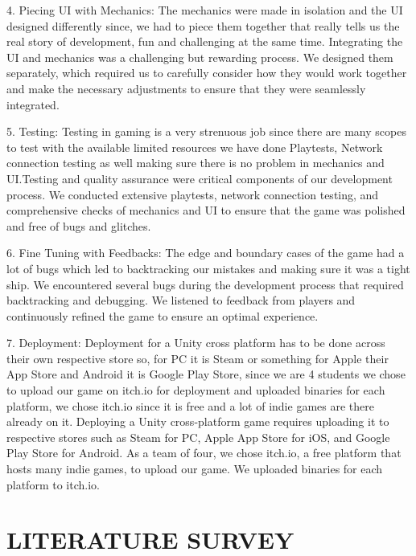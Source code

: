 \documentclass[12pt]{report}
\begin{document}
4.	Piecing UI with Mechanics: The mechanics were made in isolation and the UI designed differently since, we had to piece them together that really tells us the real story of development, fun and challenging at the same time. Integrating the UI and mechanics was a challenging but rewarding process. We designed them separately, which required us to carefully consider how they would work together and make the necessary adjustments to ensure that they were seamlessly integrated.

5.	Testing: Testing in gaming is a very strenuous job since there are many scopes to test with the available limited resources we have done Playtests, Network connection testing as well making sure there is no problem in mechanics and UI.Testing and quality assurance were critical components of our development process. We conducted extensive playtests, network connection testing, and comprehensive checks of mechanics and UI to ensure that the game was polished and free of bugs and glitches.

6.	Fine Tuning with Feedbacks: The edge and boundary cases of the game had a lot of bugs which led to backtracking our mistakes and making sure it was a tight ship. We encountered several bugs during the development process that required backtracking and debugging. We listened to feedback from players and continuously refined the game to ensure an optimal experience.

7.	Deployment: Deployment for a Unity cross platform has to be done across their own respective store so, for PC it is Steam or something for Apple their App Store and Android it is Google Play Store, since we are 4 students we chose to upload our game on itch.io for deployment and uploaded binaries for each platform, we chose itch.io since it is free and a lot of indie games are there already on it. Deploying a Unity cross-platform game requires uploading it to respective stores such as Steam for PC, Apple App Store for iOS, and Google Play Store for Android. As a team of four, we chose itch.io, a free platform that hosts many indie games, to upload our game. We uploaded binaries for each platform to itch.io.

\clearpage

\centering
\section{LITERATURE SURVEY}

\end{document}
